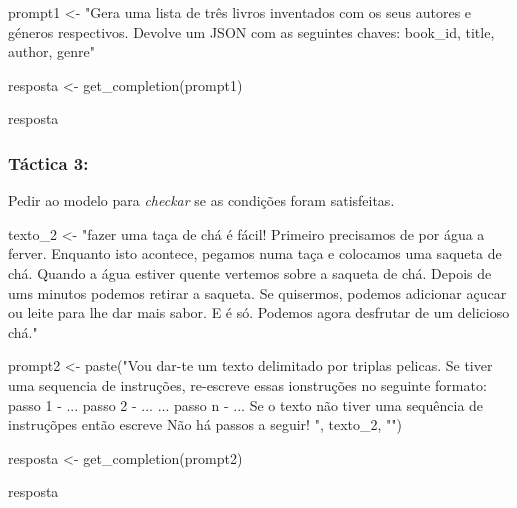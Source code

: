 \documentclass[
  letterpaper,
  paper=6in:9in,
  pagesize=pdftex,
  headinclude=on,
  footinclude=on,
  12pt]{scrbook}
\newenvironment{Shaded}{\begin{snugshade}}{\end{snugshade}}
\newcommand{\FunctionTok}[1]{\textcolor[rgb]{0.28,0.35,0.67}{#1}}
\newcommand{\NormalTok}[1]{\textcolor[rgb]{0.00,0.23,0.31}{#1}}
\newcommand{\OtherTok}[1]{\textcolor[rgb]{0.00,0.23,0.31}{#1}}
\newcommand{\StringTok}[1]{\textcolor[rgb]{0.13,0.47,0.30}{#1}}
\begin{document}
\begin{Shaded}
\begin{Highlighting}[]
\NormalTok{prompt1 }\OtherTok{\textless{}{-}} \StringTok{"Gera uma lista de três livros inventados com os seus autores e géneros respectivos. }
\StringTok{Devolve um JSON com as seguintes chaves: book\_id, title, author, genre"} 

\NormalTok{resposta }\OtherTok{\textless{}{-}} \FunctionTok{get\_completion}\NormalTok{(prompt1)}

\NormalTok{resposta}
\end{Highlighting}
\end{Shaded}

\hypertarget{tuxe1ctica-3}{%
\subsubsection{Táctica 3:}\label{tuxe1ctica-3}}

Pedir ao modelo para \emph{checkar} se as condições foram satisfeitas.

\begin{Shaded}
\begin{Highlighting}[]
\NormalTok{texto\_2 }\OtherTok{\textless{}{-}} \StringTok{"fazer uma taça de chá é fácil! Primeiro precisamos de por água a ferver. }
\StringTok{Enquanto isto acontece, pegamos numa taça e colocamos uma saqueta de chá. }
\StringTok{Quando a água estiver quente vertemos sobre a saqueta de chá. }
\StringTok{Depois de ums minutos podemos retirar a saqueta. Se quisermos, }
\StringTok{podemos adicionar açucar ou leite para lhe dar mais sabor. E é só. }
\StringTok{Podemos agora desfrutar de um delicioso chá."}

\NormalTok{prompt2 }\OtherTok{\textless{}{-}} \FunctionTok{paste}\NormalTok{(}\StringTok{"Vou dar{-}te um texto delimitado por triplas pelicas. }
\StringTok{Se tiver uma sequencia de instruções, re{-}escreve essas ionstruções no seguinte formato:}
\StringTok{                 passo 1 {-} ...}
\StringTok{                 passo 2 {-} ...}
\StringTok{                 ...}
\StringTok{                 passo n {-} ...}
\StringTok{                 Se o texto não tiver uma sequência de instruçõpes então escreve }
\StringTok{\textquotesingle{}Não há passos a seguir!\textquotesingle{}}
\StringTok{\textquotesingle{}\textquotesingle{}\textquotesingle{} "}\NormalTok{, texto\_2, }\StringTok{"\textquotesingle{}\textquotesingle{}\textquotesingle{}"}\NormalTok{)}

\NormalTok{resposta }\OtherTok{\textless{}{-}} \FunctionTok{get\_completion}\NormalTok{(prompt2)}

\NormalTok{resposta}
\end{Highlighting}
\end{Shaded}
\end{document}
